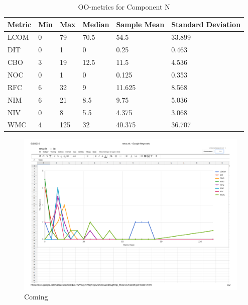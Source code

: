 \begin{table}[]
\centering
\caption{OO-metrics for Component N}
\label{tab:oometrics-netw}
\begin{tabular}{|l|l|l|l|l|l|}
\hline
\textbf{Metric} & \textbf{Min} & \textbf{Max} & \textbf{Median} & \textbf{Sample Mean} & \textbf{Standard Deviation} \\ \hline
LCOM            & 0            & 79           & 70.5            & 54.5                 & 33.899                      \\ \hline
DIT             & 0            & 1            & 0               & 0.25                 & 0.463                       \\ \hline
CBO             & 3            & 19           & 12.5            & 11.5                   & 4.536                       \\ \hline
NOC             & 0            & 1            & 0               & 0.125                & 0.353                       \\ \hline
RFC             & 6            & 32           & 9               & 11.625               & 8.568                       \\ \hline
NIM             & 6            & 21           & 8.5             & 9.75                 & 5.036                       \\ \hline
NIV             & 0            & 8            & 5.5             & 4.375                & 3.068                       \\ \hline
WMC            & 4            & 125          & 32              & 40.375                 & 36.707                      \\ \hline
\end{tabular}
\end{table}


\begin{landscape}
\setlength\LTleft{-.5in}
	\begin{figure}
	\centering
	\includegraphics[width=\textwidth]{images/pdf/network.pdf}
	\caption{Coming}
	\label{fig:netgraph}
	\end{figure}
\end{landscape}



